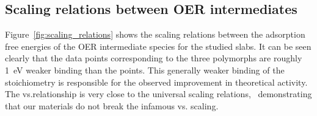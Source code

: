 \subsection{Scaling relations between OER intermediates}
%


%
%
Figure~\ref{fig:scaling_relations} shows the scaling relations between the adsorption free energies of the OER intermediate species for the studied \IrOx slabs.
%
It can be seen clearly that the data points corresponding to the three \IrOthree polymorphs are roughly \SI{1}{\electronvolt} weaker binding than the \rIrOtwo points.
%
This generally weaker binding of the \IrOthree stoichiometry is responsible for the observed improvement in theoretical activity.
%
The \DGOOH vs.\DGOH relationship is very close to the universal scaling relations,~\cite{Man2011} demonstrating that our materials do not break the infamous \DGOOH vs. \DGOH scaling.





